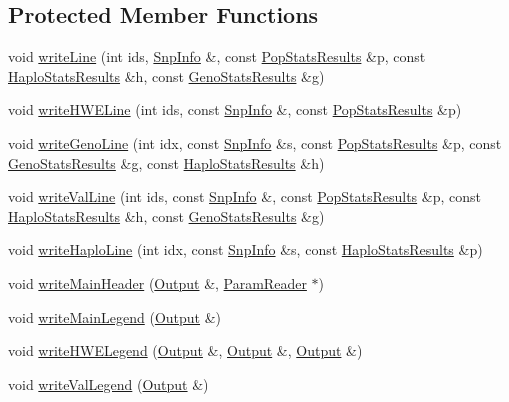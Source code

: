 \subsection*{Protected Member Functions}
\begin{DoxyCompactItemize}
\item 
void \hyperlink{classSnpgwaOutput_a24ceac8c558ceeee26925f67d64498a4}{writeLine} (int ids, \hyperlink{classSnpInfo}{SnpInfo} \&, const \hyperlink{structPopStatsResults}{PopStatsResults} \&p, const \hyperlink{structHaploStatsResults}{HaploStatsResults} \&h, const \hyperlink{structGenoStatsResults}{GenoStatsResults} \&g)
\item 
void \hyperlink{classSnpgwaOutput_a9af518ccbe41e8cf1a2c91738ed1c5b6}{writeHWELine} (int ids, const \hyperlink{classSnpInfo}{SnpInfo} \&, const \hyperlink{structPopStatsResults}{PopStatsResults} \&p)
\item 
void \hyperlink{classSnpgwaOutput_a303a7331ed885b2f9c400ba25823a8c0}{writeGenoLine} (int idx, const \hyperlink{classSnpInfo}{SnpInfo} \&s, const \hyperlink{structPopStatsResults}{PopStatsResults} \&p, const \hyperlink{structGenoStatsResults}{GenoStatsResults} \&g, const \hyperlink{structHaploStatsResults}{HaploStatsResults} \&h)
\item 
void \hyperlink{classSnpgwaOutput_ae00da2c5932ccf64bb0b69248ae1a9c2}{writeValLine} (int ids, const \hyperlink{classSnpInfo}{SnpInfo} \&, const \hyperlink{structPopStatsResults}{PopStatsResults} \&p, const \hyperlink{structHaploStatsResults}{HaploStatsResults} \&h, const \hyperlink{structGenoStatsResults}{GenoStatsResults} \&g)
\item 
void \hyperlink{classSnpgwaOutput_a090565719776955cc321e83d55693205}{writeHaploLine} (int idx, const \hyperlink{classSnpInfo}{SnpInfo} \&s, const \hyperlink{structHaploStatsResults}{HaploStatsResults} \&p)
\item 
void \hyperlink{classSnpgwaOutput_a0b1354058143385bc05448b3aec6e981}{writeMainHeader} (\hyperlink{classOutput}{Output} \&, \hyperlink{classParamReader}{ParamReader} $\ast$)
\item 
void \hyperlink{classSnpgwaOutput_a60154ce496b7b01f476ac7c2d3056004}{writeMainLegend} (\hyperlink{classOutput}{Output} \&)
\item 
void \hyperlink{classSnpgwaOutput_a2090144186c1c1a6a832c36094661087}{writeHWELegend} (\hyperlink{classOutput}{Output} \&, \hyperlink{classOutput}{Output} \&, \hyperlink{classOutput}{Output} \&)
\item 
void \hyperlink{classSnpgwaOutput_a2499f64888296d1e418175cf4742d506}{writeValLegend} (\hyperlink{classOutput}{Output} \&)

\end{DoxyCompactItemize}
